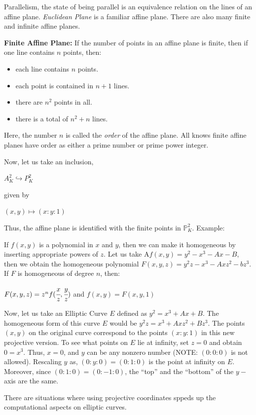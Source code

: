\documentclass[a4paper, 12pt]{article}
\begin{document}
Parallelism, the state of being parallel is an equivalence relation on the lines of an affine plane. \textit{Euclidean Plane} is a familiar affine plane. There are also many finite and infinite affine planes. \par
\textbf{Finite Affine Plane:} If the number of points in an affine plane is finite, then if one line contains $n$ points, then:
\begin{itemize}
	\item each line contains $n$ points.
	\item each point is contained in $n+1$ lines.
	\item there are $n^2$ points in all.
	\item there is a total of $n^2 + n$ lines.
\end{itemize}
Here, the number $n$ is called the \textit{order} of the affine plane. All knows finite affine planes have order as either a prime number or prime power integer.\par
Now, let us take an inclusion,
\begin{center} $\mathit{A}_K^2\hookrightarrow \mathit{P}_K^2$ \end{center} given by
\begin{center} $(x,y) \mapsto (x:y:1)$ \end{center}
Thus, the affine plane is identified with the finite points in $\mathbb{P}_K^2$. 
Example:\par
If $f(x,y)$ is a polynomial in $x$ and $y$, then we can make it homogeneous by inserting appropriate powers of $z$. Let us take A$f(x,y)=y^2-x^3-Ax-B$, then we obtain the homogeneous polynomial $F(x,y,z)=y^2z-x^3-Axz^2-bz^3$. If $F$ is homogeneous of degree $n$, then:
\begin{center} $F(x,y,z)=z^nf(\cfrac{x}{z},\cfrac{y}{z})$ and $f(x,y)=F(x,y,1)$\end{center}
Now, let us take an Elliptic Curve $E$ defined as $y^2=x^3+Ax+B$. The homogeneous form of this curve $E$ would be $y^2z=x^3+Axz^2+Bz^3$. The points $(x,y)$ on the original curve correspond to the points $(x:y:1)$ in this new projective version. To see what points on $E$ lie at infinity, set $z=0$ and obtain $0=x^3$. Thus, $x=0$, and $y$ can be any nonzero number (NOTE: $(0:0:0)$ is not allowed). Rescaling $y$ as, $(0:y:0) = (0:1:0)$ is the point at infinity on $E$. Moreover, since $(0:1:0) = (0:-1:0)$, the ``top'' and the ``bottom'' of the $y-$axis are the same.\par
There are situations where using projective coordinates sppeds up the computational aspects on elliptic curves. 
\end{document}
